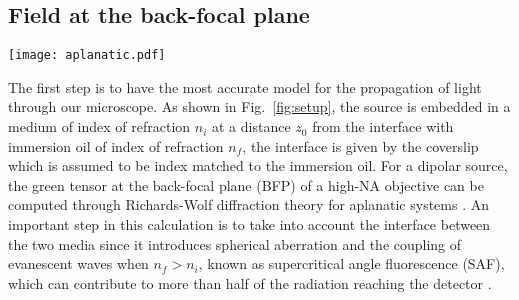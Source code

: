 \documentclass[reprint,aps,pra,superscriptaddress,
amsmath,amssymb]{revtex4-1}
\begin{document}
\subsection{Field at the back-focal plane}

\begin{figure*}
  \centering
  \texttt{[image: aplanatic.pdf]}
  \caption{\label{fig:setup} Schematic of the experimental setup for the 
  collection and shaping of the emission by a source. (left) Schematic of the position 
  source, in this case represented by a fluorescent nanobead, with respect
  to the interface between the embedding medium of index of refraction
  $n_i$ with the immersion medium of index of refraction $n_f$ used for 
  the high-NA microscope objective and of the focal plane. (right) 
  Schematic of the collection arm composed of a microscope objective (MO), 
  followed by a birefringent mask (BM) and a polarization analyzer (PA). 
  The light at the BFP is then focused onto the camera by the tube lens 
  of focal length $f_\text{tl}$. }
\end{figure*}

The first step is to have the most accurate model for the propagation 
of light through our microscope. As shown in Fig.~\ref{fig:setup}, 
the source is embedded in a medium of index of refraction $n_i$ at a 
distance $z_0$ from the interface with immersion oil of index of 
refraction $n_f$, the interface is given by the coverslip which is assumed
to be index matched to the immersion oil. For a dipolar source, the green 
tensor at the back-focal plane (BFP) of a high-NA objective can be 
computed through Richards-Wolf diffraction 
theory for aplanatic systems \cite{richards1959electromagnetic,
novotny2006principles}. An important step in this calculation is to  
take into account the interface between the two media since it introduces 
spherical aberration and the coupling of evanescent waves when $n_f > n_i$,
known as supercritical angle fluorescence (SAF), 
which  can contribute to more than 
half of the radiation reaching the detector \cite{hellen1987fluorescence,
axelrod2001total,axelrod2013evanescent}.
\end{document}
